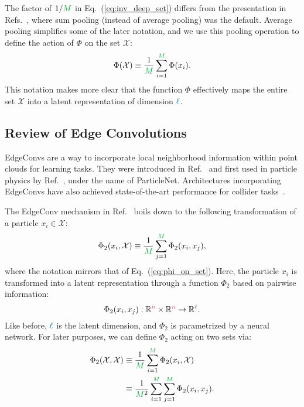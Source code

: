 \documentclass[aps,prd,twocolumn,superscriptaddress,floatfix,longbibliography,preprintnumbers,nofootinbib]{revtex4-1} %
\DeclareRobustCommand{\Eq}[1]{Eq.~(\ref{eq:#1})}
\DeclareRobustCommand{\RRefs}[1]{Refs.~\cite{#1}}
\newcounter{para}
\newcommand{\reft}[1]{Ref.~\cite{#1}}
\begin{document}
The factor of $1/{\color{c2} M}$ in \Eq{inv_deep_set} differs from the presentation in \RRefs{Zaheer2017,Komiske:2018cqr}, where sum pooling (instead of average pooling) was the default.
%
Average pooling simplifies some of the later notation, and we use this pooling operation to define the action of $\Phi$ on the set $\mathcal X$:
%
\begin{equation}
\label{eq:phi_on_set}
\Phi(\mathcal{X}) \equiv \frac{1}{\color{c2} M} \sum_{i=1}^{{\color{c2} M}} \Phi(x_i).
\end{equation}
%
This notation makes more clear that the function $\Phi$ effectively maps the entire set $\mathcal X$ into a latent representation of dimension ${\color{c3}\ell}$.


\subsection{Review of Edge Convolutions}
  \label{sec:edgeconv}
  EdgeConvs are a way to incorporate local neighborhood information within point clouds for learning tasks.
  They were introduced in \reft{Wang:2018nkf} and first used in particle physics by \reft{Qu:2019gqs}, under the name of ParticleNet.
  Architectures incorporating EdgeConvs have also achieved state-of-the-art performance for collider tasks~\cite{Kasieczka:2019dbj}. 
  
  

  The EdgeConv mechanism in \reft{Wang:2018nkf} boils down to the following transformation of a particle \(x_i\in\mathcal X\):
      \begin{equation}
        \label{eq:latent2}
        \Phi_2(x_i,\mathcal X) \equiv  \frac{1}{{\color{c2} M}}\sum_{j=1}^{{\color{c2} M}} \Phi_2(x_i,x_j),
      \end{equation}
      where the notation mirrors that of \Eq{phi_on_set}.
      Here, the particle $x_i$ is transformed into a latent representation through a function $\Phi_2$ based on pairwise information: 
      \begin{equation}
      \Phi_2(x_i,x_j):\mathbb R^{\color{c1}n}\times \mathbb R^{\color{c1}n}\rightarrow\mathbb R^{\color{c3}\ell}.
      \label{eq:latent2dim}
      \end{equation}
      Like before, ${\color{c3}\ell}$ is the latent dimension, and  $\Phi_2$ is parametrized by a neural network.
      For later purposes, we can define $\Phi_2$ acting on two sets via:
      \begin{align}
      \nonumber
      \Phi_2(\mathcal X,\mathcal X) & \equiv  \frac{1}{{\color{c2} M}}\sum_{i=1}^{{\color{c2} M}} \Phi_2(x_i,\mathcal X) \\ & \equiv  \frac{1}{{\color{c2} M}^2}\sum_{i=1}^{{\color{c2} M}} \sum_{j=1}^{{\color{c2} M}} \Phi_2(x_i,x_j).\label{eq:phi2_on_sets}
      \end{align}
\end{document}
